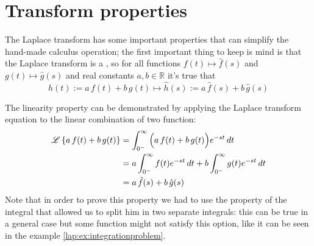 \section{Transform properties}
	
	The Laplace transform has some important properties that can simplify the hand-made calculus operation; the first important thing to keep is mind is that the Laplace transform is a , so for all functions $f(t)\mapsto \hat f(s)$ and $g(t)\mapsto \hat g(s)$ and real constants $a,b\in \mathds R$ it's true that
	\begin{equation}
		h(t) := a \, f(t) + b\, g(t) \mapsto \hat h(s) := a\, \hat f(s) + b \, \hat g(s)
	\end{equation} 
	
	\begin{demonstration} \label{lap:dem:linearity}
		The linearity property can be demonstrated by applying the Laplace transform equation to the linear combination of two function:
		\begin{align*}
			\mathscr{L} \left\{ a \, f(t) + b\, g(t) \right\} & = \int_{0^-}^\infty \Big( a\, f(t) + b\, g(t)\Big)e^{-st}\, dt \\
			& = a \int_{0^-}^\infty f(t) e^{-st}\, dt + b \int_{0^-}^\infty g(t) e^{-st}\, dt \\
			& = a \, \hat f(s) + b \, \hat g(s)
		\end{align*}
		Note that in order to prove this property we had to use the property of the integral that allowed us to split him in two separate integrals: this can be true in a general case but some function might not satisfy this option, like it can be seen in the example \ref{lap:ex:integrationproblem}.
	\end{demonstration}
	
